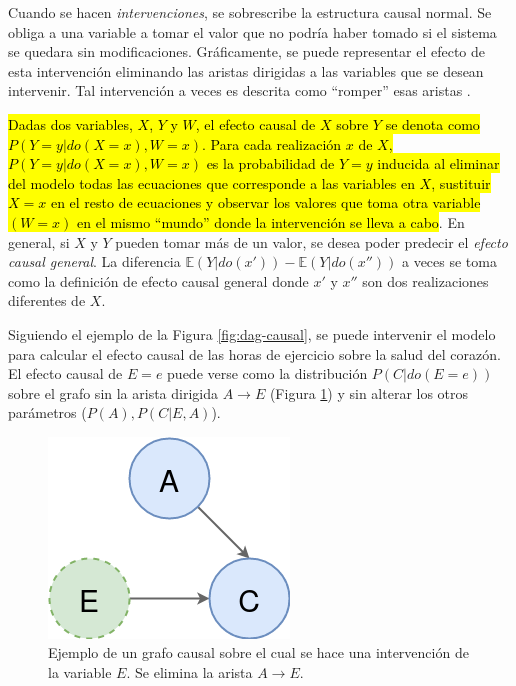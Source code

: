 Cuando se hacen \textit{intervenciones},
se sobrescribe la estructura causal normal. Se obliga a una
variable a tomar el valor que no podría haber tomado 
si el sistema se quedara sin modificaciones.
Gráficamente, se puede representar el
efecto de esta intervención eliminando las aristas 
dirigidas a las variables que se desean intervenir. Tal
intervención a veces es descrita como ``romper'' esas aristas \cite{sep-causal-models}.

\hl{Dadas dos variables, $X$, $Y$ y $W$,
el efecto causal de $X$ sobre $Y$ se denota como $P(Y=y|do(X=x), W=x)$. Para 
cada realización $x$ de $X$, $P(Y=y| do(X=x), W=x)$ es la probabilidad de $Y=y$ 
inducida al eliminar del modelo todas las ecuaciones que corresponde a las
variables en $X$, sustituir $X=x$ en el resto de ecuaciones y observar los valores que toma otra variable $(W=x)$ en el mismo ``mundo'' donde la intervención se lleva a cabo}.
En general, si $X$ y $Y$ pueden tomar más de un valor, se desea poder
predecir el \textit{efecto causal general}.
La diferencia $\mathbb{E}(Y|do(x'))- \mathbb{E}(Y|do(x''))$ a veces
se toma como la definición de efecto causal general \cite{theoryofcausalities2006, pearl2016causal}
donde $x'$ y $x''$ son dos realizaciones diferentes de $X$.

Siguiendo el ejemplo de la Figura \ref{fig:dag-causal}, se puede intervenir
el modelo para calcular el efecto causal de las horas
de ejercicio sobre la salud del corazón. El efecto causal de $E=e$ puede 
verse como la distribución $P(C | do(E=e))$ sobre el grafo sin la arista
dirigida $A \rightarrow E$ (Figura \ref{fig:dag-intervention}) y sin alterar los otros parámetros ($P(A), P(C|E, A)$).

\begin{figure}
    \centering
    \includegraphics[scale=0.35]{Chapter2/Figs/example-dag-intervention.png}
    \caption{Ejemplo de un grafo causal sobre el cual se hace una intervención de
    la variable $E$. Se elimina la arista $A \rightarrow E$.}
    \label{fig:dag-intervention}
\end{figure}

